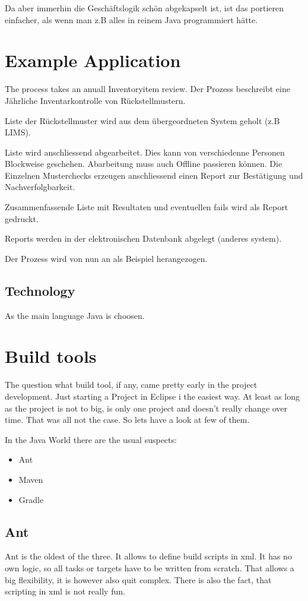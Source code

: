 \documentclass[paper=a4,twoside=false,BCOR=0mm,DIV=calc,fontsize=12pt]{scrartcl}
\begin{document}
Da aber immerhin die Geschäftslogik schön abgekapselt ist, ist das portieren einfacher, als wenn man z.B alles in reinem Java programmiert
hätte.


\section{Example Application}
The process takes an anuall Inventoryitem review. 
Der Prozess beschreibt eine Jährliche Inventarkontrolle von Rückstellmustern.

Liste der Rückstellmuster wird aus dem übergeordneten System geholt (z.B LIMS). 

Liste wird anschliessend abgearbeitet. Dies kann von verschiedenne Personen Blockweise geschehen. Abarbeitung muss auch Offline passieren
können. Die Einzelnen Musterchecks erzeugen anschliessend einen Report zur Bestätigung und Nachverfolgbarkeit.

Zusammenfassende Liste mit Resultaten und eventuellen fails wird als Report gedruckt.

Reports werden in der elektronischen Datenbank abgelegt (anderes system). 

Der Prozess wird von nun an als Beispiel herangezogen.

\subsection{Technology}
As the main language Java is choosen.



\section{Build tools}
The question what build tool, if any, came pretty early in the project development. Just starting a Project in Eclipse i the easiest way. 
At least as long as the project is not to big, is only one project and doesn't really change over time. That was all not the case. So lets have a look at few of them. 

In the Java World there are the usual suspects:
\begin{itemize}
 \item Ant
 \item Maven
 \item Gradle
\end{itemize}

\subsection{Ant}
Ant is the oldest of the three. It allows to define build scripts in xml. 
It has no own logic, so all tasks or targets have to be written from scratch.
That allows a big flexibility, it is however also quit complex. There is also the fact,
that scripting in xml is not really fun.
\end{document}
